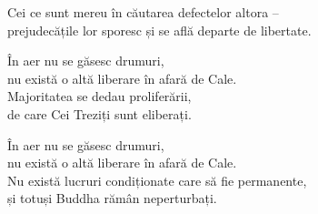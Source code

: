 Cei ce sunt mereu în căutarea defectelor altora –\\
prejudecățile lor sporesc și se află departe de libertate.


În aer nu se găsesc drumuri,\\
nu există o altă liberare în afară de Cale.\\
Majoritatea se dedau proliferării,\\
de care Cei Treziți sunt eliberați.


În aer nu se găsesc drumuri,\\
nu există o altă liberare în afară de Cale.\\
Nu există lucruri condiționate care să fie permanente,\\
și totuși Buddha rămân neperturbați.

